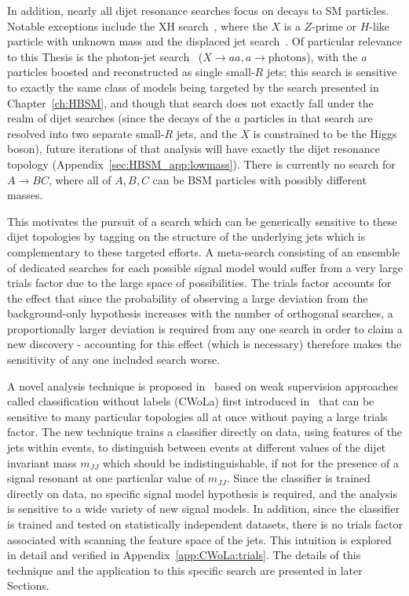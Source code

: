 In addition, nearly all dijet resonance searches focus on decays to SM particles.
Notable exceptions include the XH search~\cite{Aaboud:2018eoy,Aaboud:2017ecz}, where the $X$ is a $Z$-prime or $H$-like particle with unknown mass and the displaced jet search~\cite{Aaboud:2018aqj}.
Of particular relevance to this Thesis is the photon-jet search~\cite{Aaboud:2018djx} ($X\rightarrow aa, a\rightarrow \text{photons}$), with the $a$ particles boosted and reconstructed as single small-$R$ jets;
this search is sensitive to exactly the same class of models being targeted by the search presented in Chapter~\ref{ch:HBSM}, and though that search does not exactly fall under the realm of dijet searches (since the decays of the $a$ particles in that search are resolved into two separate small-$R$ jets, and the $X$ is constrained to be the Higgs boson),
future iterations of that analysis will have exactly the dijet resonance topology (Appendix~\ref{sec:HBSM_app:lowmass}).
There is currently no search for $A\rightarrow BC$, where all of $A,B,C$ can be BSM particles with possibly different masses.

This motivates the pursuit of a search which can be generically sensitive to these dijet topologies by tagging on the structure of the underlying jets which is complementary to these targeted efforts.
A meta-search consisting of an ensemble of dedicated searches for each possible signal model would suffer from a very large trials factor due to the large space of possibilities.
The trials factor accounts for the effect that since the probability of observing a large deviation from the background-only hypothesis increases with the number of orthogonal searches, a proportionally larger deviation is required from any one search in order to claim a new discovery - accounting for this effect (which is necessary) therefore makes the sensitivity of any one included search worse.

A novel analysis technique is proposed in~\cite{Collins:2018epr,Collins:2019jip} based on weak supervision approaches called classification without labels (CWoLa) first introduced in~\cite{Metodiev:2017vrx} that can be sensitive to many particular topologies all at once without paying a large trials factor.
The new technique trains a classifier directly on data, using features of the jets within events, to distinguish between events at different values of the dijet invariant mass $m_{JJ}$ which should be indistinguishable, if not for the presence of a signal resonant at one particular value of $m_{JJ}$.
Since the classifier is trained directly on data, no specific signal model hypothesis is required, and the analysis is sensitive to a wide variety of new signal models.
In addition, since the classifier is trained and tested on statistically independent datasets, there is no trials factor associated with scanning the feature space of the jets.
This intuition is explored in detail and verified in Appendix~\ref{app:CWoLa:trials}.
The details of this technique and the application to this specific search are presented in later Sections.

